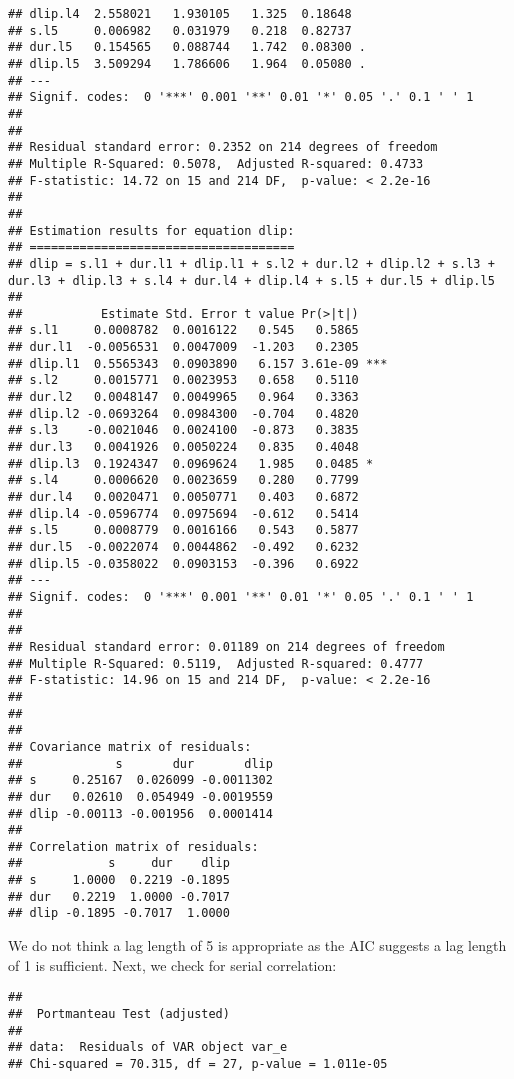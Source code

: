 \documentclass[]{article}
\begin{document}
\begin{verbatim}
## dlip.l4  2.558021   1.930105   1.325  0.18648    
## s.l5     0.006982   0.031979   0.218  0.82737    
## dur.l5   0.154565   0.088744   1.742  0.08300 .  
## dlip.l5  3.509294   1.786606   1.964  0.05080 .  
## ---
## Signif. codes:  0 '***' 0.001 '**' 0.01 '*' 0.05 '.' 0.1 ' ' 1
## 
## 
## Residual standard error: 0.2352 on 214 degrees of freedom
## Multiple R-Squared: 0.5078,  Adjusted R-squared: 0.4733 
## F-statistic: 14.72 on 15 and 214 DF,  p-value: < 2.2e-16 
## 
## 
## Estimation results for equation dlip: 
## ===================================== 
## dlip = s.l1 + dur.l1 + dlip.l1 + s.l2 + dur.l2 + dlip.l2 + s.l3 + dur.l3 + dlip.l3 + s.l4 + dur.l4 + dlip.l4 + s.l5 + dur.l5 + dlip.l5 
## 
##           Estimate Std. Error t value Pr(>|t|)    
## s.l1     0.0008782  0.0016122   0.545   0.5865    
## dur.l1  -0.0056531  0.0047009  -1.203   0.2305    
## dlip.l1  0.5565343  0.0903890   6.157 3.61e-09 ***
## s.l2     0.0015771  0.0023953   0.658   0.5110    
## dur.l2   0.0048147  0.0049965   0.964   0.3363    
## dlip.l2 -0.0693264  0.0984300  -0.704   0.4820    
## s.l3    -0.0021046  0.0024100  -0.873   0.3835    
## dur.l3   0.0041926  0.0050224   0.835   0.4048    
## dlip.l3  0.1924347  0.0969624   1.985   0.0485 *  
## s.l4     0.0006620  0.0023659   0.280   0.7799    
## dur.l4   0.0020471  0.0050771   0.403   0.6872    
## dlip.l4 -0.0596774  0.0975694  -0.612   0.5414    
## s.l5     0.0008779  0.0016166   0.543   0.5877    
## dur.l5  -0.0022074  0.0044862  -0.492   0.6232    
## dlip.l5 -0.0358022  0.0903153  -0.396   0.6922    
## ---
## Signif. codes:  0 '***' 0.001 '**' 0.01 '*' 0.05 '.' 0.1 ' ' 1
## 
## 
## Residual standard error: 0.01189 on 214 degrees of freedom
## Multiple R-Squared: 0.5119,  Adjusted R-squared: 0.4777 
## F-statistic: 14.96 on 15 and 214 DF,  p-value: < 2.2e-16 
## 
## 
## 
## Covariance matrix of residuals:
##             s       dur       dlip
## s     0.25167  0.026099 -0.0011302
## dur   0.02610  0.054949 -0.0019559
## dlip -0.00113 -0.001956  0.0001414
## 
## Correlation matrix of residuals:
##            s     dur    dlip
## s     1.0000  0.2219 -0.1895
## dur   0.2219  1.0000 -0.7017
## dlip -0.1895 -0.7017  1.0000
\end{verbatim}

We do not think a lag length of 5 is appropriate as the AIC suggests a
lag length of 1 is sufficient. Next, we check for serial correlation:

\begin{verbatim}
## 
##  Portmanteau Test (adjusted)
## 
## data:  Residuals of VAR object var_e
## Chi-squared = 70.315, df = 27, p-value = 1.011e-05
\end{verbatim}
\end{document}
